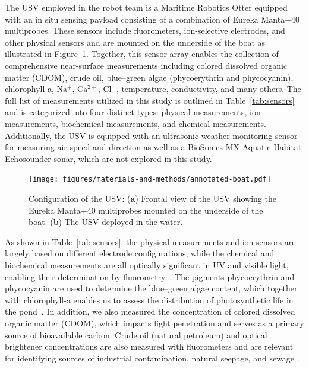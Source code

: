 \documentclass[remotesensing,article,accept,pdftex,moreauthors]{Definitions/mdpi}
\begin{document}
The USV employed in the robot team is a Maritime Robotics Otter equipped with an in situ sensing payload consisting of a combination of Eureka Manta+40 multiprobes. These sensors include fluorometers, ion-selective electrodes, and other physical sensors and are mounted on the underside of the boat as illustrated in Figure~\ref{fig:boat-components}. Together, this sensor array enables the collection of comprehensive near-surface measurements including colored dissolved organic matter (CDOM), crude oil, blue--green algae (phycoerythrin and phycocyanin), chlorophyll-a, $\mathrm{Na^+}$, $\mathrm{Ca^{2+}}$, $\mathrm{Cl^-}$, temperature, conductivity, and many others. The full list of measurements utilized in this study is outlined in Table~\ref{tab:sensors} and is categorized into four distinct types: physical measurements, ion measurements, biochemical measurements, and chemical measurements. Additionally, the USV is equipped with an ultrasonic weather monitoring sensor for measuring air speed and direction as well as a BioSonics MX Aquatic Habitat Echosounder sonar, which are not explored in this study.

\begin{figure}[H]
\hspace{-6pt}\texttt{[image: figures/materials-and-methods/annotated-boat.pdf]}
\caption{Configuration of the USV: (\textbf{a}) Frontal view of the USV showing the Eureka Manta+40 multiprobes mounted on the underside of the boat. (\textbf{b}) The USV deployed in the water.\label{fig:boat-components}}
\end{figure} 

As shown in Table~\ref{tab:sensors}, the physical measurements and ion sensors are largely based on different electrode configurations, while the chemical and biochemical measurements are all optically significant in UV and visible light, enabling their determination by fluorometry~\mbox{\cite{de2007ion,trees2002fluorometric,tillman2017evaluation}}. The pigments phycoerythrin and phycocyanin are used to determine the blue--green algae content, which together with chlorophyll-a enables us to assess the distribution of photosynthetic life in the pond~\cite{Brient2008APP, boyer2009phytoplankton}. In addition, we also measured the concentration of colored dissolved organic matter (CDOM), which impacts light penetration and serves as a primary source of bioavailable carbon. Crude oil (natural petroleum) and optical brightener concentrations are also measured with fluorometers and are relevant for identifying sources of industrial contamination, natural seepage, and sewage \cite{brown2003review,cao2009evaluation}. 
\end{document}
